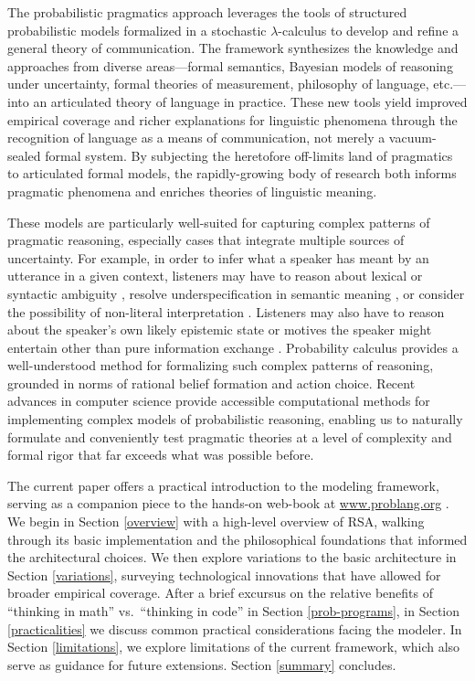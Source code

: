 \documentclass{sp}
\begin{document}
The probabilistic pragmatics approach leverages the tools of structured probabilistic models formalized in a stochastic $\lambda$-calculus to develop and refine a general theory of communication. The framework synthesizes the knowledge and approaches from diverse areas---formal semantics, Bayesian models of reasoning under uncertainty, formal theories of measurement, philosophy of language, etc.---into an articulated theory of language in practice. These new tools yield improved empirical coverage and richer explanations for linguistic phenomena through the recognition of language as a means of communication, not merely a vacuum-sealed formal system. By subjecting the heretofore off-limits land of pragmatics to articulated formal models, the rapidly-growing body of research both informs pragmatic phenomena and enriches theories of linguistic meaning.

These models are particularly well-suited for capturing complex patterns of pragmatic reasoning, especially cases that integrate multiple sources of uncertainty. For example, in order to infer what a speaker has meant by an utterance in a given context, listeners may have to reason about lexical or syntactic ambiguity \citep{bergenetal2016,savinellietal2017,FrankeBergen2020:Theory-driven-s}, resolve underspecification in semantic meaning \citep{lassitergoodman2013}, or consider the possibility of non-literal interpretation \citep{kaoetal2014metaphor,kaoetal2014}. Listeners may also have to reason about the speaker's own likely epistemic state \citep{goodmanstuhlmuller2013,scontrasgoodman2017,HerbstrittFranke2019:Complex-probabi} or motives the speaker might entertain other than pure information exchange \citep{yoonetal2016,yoonetal2017}. Probability calculus provides a well-understood method for formalizing such complex patterns of reasoning, grounded in norms of rational belief formation and action choice. Recent advances in computer science provide accessible computational methods for implementing complex models of probabilistic reasoning, enabling us to naturally formulate and conveniently test pragmatic theories at a level of complexity and formal rigor that far exceeds what was possible before.

The current paper offers a practical introduction to the modeling framework, serving as a companion piece to the hands-on web-book at \href{https://www.problang.org}{www.problang.org} \citep{problang}. We begin in Section \ref{overview} with a high-level overview of RSA, walking through its basic implementation and the philosophical foundations that informed the architectural choices. We then explore variations to the basic architecture in Section \ref{variations}, surveying technological innovations that have allowed for broader empirical coverage. After a brief excursus on the relative benefits of ``thinking in math'' vs.~``thinking in code'' in Section \ref{prob-programs}, in Section \ref{practicalities} we discuss common practical considerations facing the modeler. In Section \ref{limitations}, we explore limitations of the current framework, which also serve as guidance for future extensions. Section \ref{summary} concludes.
\end{document}
